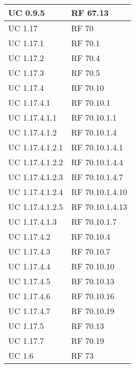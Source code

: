 {\begin{longtable} [c]{| p{4cm} | p{4cm} |}
 \hline 
UC 0.9.5 & RF 67.13\\ 
 \hline 
UC 1.17 & RF 70\\ 
 \hline 
UC 1.17.1 & RF 70.1\\ 
 \hline 
UC 1.17.2 & RF 70.4\\ 
 \hline 
UC 1.17.3 & RF 70.5\\ 
 \hline 
UC 1.17.4 & RF 70.10\\ 
 \hline 
UC 1.17.4.1 & RF 70.10.1\\ 
 \hline 
UC 1.17.4.1.1 & RF 70.10.1.1\\ 
 \hline 
UC 1.17.4.1.2 & RF 70.10.1.4\\ 
 \hline 
UC 1.17.4.1.2.1 & RF 70.10.1.4.1\\ 
 \hline 
UC 1.17.4.1.2.2 & RF 70.10.1.4.4\\ 
 \hline 
UC 1.17.4.1.2.3 & RF 70.10.1.4.7\\ 
 \hline 
UC 1.17.4.1.2.4 & RF 70.10.1.4.10\\ 
 \hline 
UC 1.17.4.1.2.5 & RF 70.10.1.4.13\\ 
 \hline 
UC 1.17.4.1.3 & RF 70.10.1.7\\ 
 \hline 
UC 1.17.4.2 & RF 70.10.4\\ 
 \hline 
UC 1.17.4.3 & RF 70.10.7\\ 
 \hline 
UC 1.17.4.4 & RF 70.10.10\\ 
 \hline 
UC 1.17.4.5 & RF 70.10.13\\ 
 \hline 
UC 1.17.4.6 & RF 70.10.16\\ 
 \hline 
UC 1.17.4.7 & RF 70.10.19\\ 
 \hline 
UC 1.17.5 & RF 70.13\\ 
 \hline 
UC 1.17.7 & RF 70.19\\ 
 \hline 
UC 1.6 & RF 73\\ 
 \hline 
\end{longtable}}